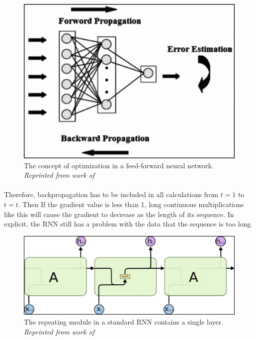 \begin{figure}[H]
  \centering
  \caption[The concept of optimization in a feed-forward neural network.]{The concept of optimization in a feed-forward neural network. \\\hspace{\textwidth} \emph{Reprinted from work of \citeauthor{donges_2019} \citeyear{donges_2019}}}\label{fig:bpp}
  \includegraphics[scale = 0.4]{figures/bpp.jpg}  
\end{figure}

\paragraph{}
Therefore, backpropagation has to be included in all calculations from $t=1$ to $t=t$. Then If the gradient value is less than 1, long continuous multiplications like this will cause the gradient to decrease as the length of its sequence. In explicit, the RNN still has a problem with the data that the sequence is too long.

\begin{figure}[H]
  \centering
  \caption[The repeating module in a standard RNN contains a single layer.]{The repeating module in a standard RNN contains a single layer. \\\hspace{\textwidth} \emph{Reprinted from work of \citeauthor{olah_2015} \citeyear{olah_2015}}}\label{fig:RNN_2}
  \includegraphics[scale = 0.2]{figures/RNN_2.jpg}  
\end{figure}

